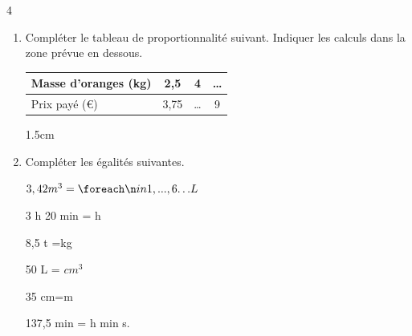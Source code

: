 \documentclass[a4paper]{book}
\begin{document}
{\begin{exerciceNote}{4}
\begin{enumerate}[leftmargin=*]
            \medskip

            \item Compléter le tableau de proportionnalité suivant. Indiquer les calculs dans la zone prévue en dessous. 
            \begin{center}
                \begin{tabular}{|l|c|c|c|}
                \hline
                Masse d'oranges (kg) & 2,5 & 4 & \dots \\ \hline
                Prix payé (€) & 3,75 & \dots & 9 \\ \hline
                \end{tabular}
            \end{center}

            \begin{ZoneReponse}{1.5cm}
            \end{ZoneReponse}

            \item Compléter les égalités suivantes.

            \medskip

            \begin{minipage}{0.3\linewidth}
                \begin{center}                
                    $3,42m^3=\points[6] L$
    
                    \medskip
    
                    3 h 20 min = \points[6] h
                \end{center}
            \end{minipage}
            \hfill \vline \hfill
            \begin{minipage}{0.3\linewidth}
                \begin{center}                
                    8,5 t =\points[6] kg
    
                    \medskip
    
                    50 L = \points[6] $cm^3$
                \end{center}
            \end{minipage}
            \hfill \vline \hfill
            \begin{minipage}{0.3\linewidth}
                \begin{center}                
                    35 cm=\points[6] m
    
                    \medskip
    
                    137,5 min = \points h \points min \points s.
                \end{center}
            \end{minipage}
        \end{enumerate}
    \end{exerciceNote}


}
\end{document}
